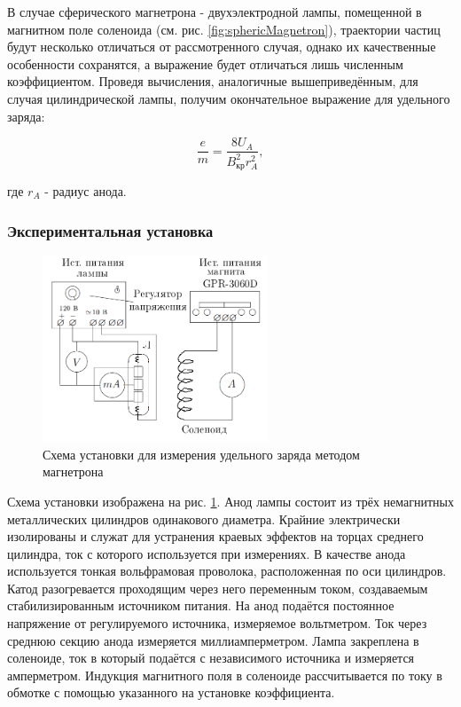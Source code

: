 \documentclass[a4paper,12pt]{article} %
\begin{document}
В случае сферического магнетрона - двухэлектродной лампы, помещенной в магнитном поле соленоида (см. рис. \ref{fig:sphericMagnetron}), траектории частиц будут несколько отличаться от рассмотренного случая, однако их качественные особенности сохранятся, а выражение будет отличаться лишь численным коэффициентом. Проведя вычисления, аналогичные вышеприведённым, для случая цилиндрической лампы, получим окончательное выражение для удельного заряда:

\begin{equation}
    \frac{e}{m} = \frac{8U_A}{B_\text{кр}^2 r_A^2},
    \label{finalB}
\end{equation}

где $r_A$ - радиус анода.

\subsubsection{Экспериментальная установка}

\begin{figure}
    \centering
    \includegraphics[width = 0.6\textwidth]{setupB.png}
    \caption{Схема установки для измерения удельного заряда методом магнетрона}
    \label{fig:setupB}
\end{figure}

Схема установки изображена на рис. \ref{fig:setupB}. Анод лампы состоит из трёх немагнитных металлических цилиндров одинакового диаметра. Крайние электрически изолированы и служат для устранения краевых эффектов на торцах среднего цилиндра, ток с которого используется при измерениях. В качестве анода используется тонкая вольфрамовая проволока, расположенная по оси цилиндров. Катод разогревается проходящим через него переменным током, создаваемым стабилизированным источником питания. На анод подаётся постоянное напряжение от регулируемого источника, измеряемое вольтметром. Ток через среднюю секцию анода измеряется миллиамперметром. Лампа закреплена в соленоиде, ток в который подаётся с независимого источника и измеряется амперметром. Индукция магнитного поля в соленоиде рассчитывается по току в обмотке с помощью указанного на установке коэффициента.
\end{document}
